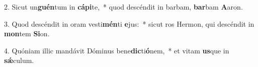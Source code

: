 2. Sicut un\textbf{guén}tum in \textbf{cá}\textbf{pi}te,~*  quod descéndit in barbam, \textbf{bar}bam \textbf{A}aron.\

3. Quod descéndit in oram vesti\textbf{mén}ti \textbf{e}jus:~*  sicut ros Hermon, qui descéndit in \textbf{mon}tem \textbf{Si}on.\

4. Quóniam illic mandávit Dóminus bene\textbf{dic}ti\textbf{ó}nem,~*  et vitam \textbf{us}que in \textbf{sǽ}culum.\

